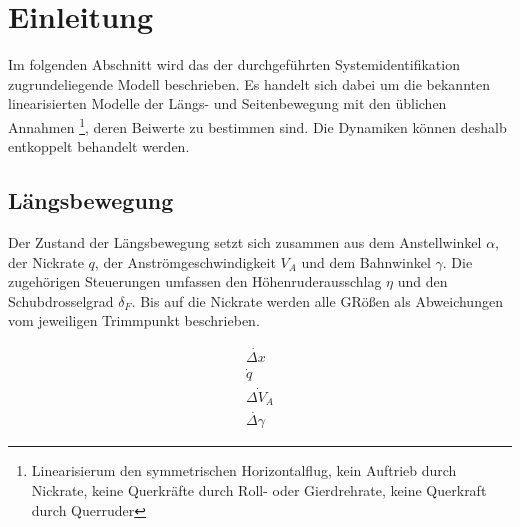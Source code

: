 \chapter{Einleitung}

Im folgenden Abschnitt wird das der durchgeführten Systemidentifikation zugrundeliegende Modell beschrieben. Es handelt sich 
dabei um die bekannten linearisierten Modelle der Längs- und Seitenbewegung 
\cite{Fichter2009} mit den üblichen Annahmen \footnote{Linearisierum den 
symmetrischen Horizontalflug, kein Auftrieb durch Nickrate, keine Querkräfte 
durch Roll- oder Gierdrehrate, keine Querkraft durch Querruder}, deren Beiwerte 
zu bestimmen sind. Die Dynamiken können deshalb entkoppelt behandelt werden. 

\section{Längsbewegung}
Der Zustand der Längsbewegung setzt sich zusammen aus dem Anstellwinkel $ 
\alpha $, der Nickrate $ q $, der Anströmgeschwindigkeit $ V_A $ und dem 
Bahnwinkel $ \gamma $. Die zugehörigen Steuerungen umfassen den 
Höhenruderausschlag $ \eta $ und den Schubdrosselgrad $ \delta_F $. Bis auf die 
Nickrate werden alle GRößen als Abweichungen vom jeweiligen Trimmpunkt 
beschrieben.

\begin{equation}
	\begin{array}{cols}
		\dot{\Delta x}\\
		\dot{q}\\
		\dot{\Delta V_A}\\
		\dot{\Delta \gamma}
	\end{array}
\end{equation}